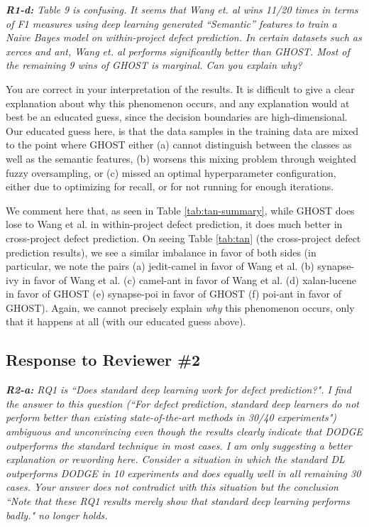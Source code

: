 \documentclass[10pt,compsoc,twocolumn]{IEEEtran}
\newcommand{\respto}[1]{
\fcolorbox{black}{black!15}{%
\label{resp:#1}%
\bf\scriptsize R{#1}}}
\newcommand{\BLUE}{\color{blue}}
\newcommand{\BLACK}{\color{black}}
\begin{document}
{\em {\bf R1-d:} Table 9 is confusing. It seems that Wang et. al wins 11/20 times in terms of F1 measures using deep learning generated “Semantic” features to train a Naive Bayes model on within-project defect prediction. In certain datasets such as xerces and ant, Wang et. al performs significantly better than GHOST. Most of the remaining 9 wins of GHOST is marginal. Can you explain why?
}

\respto{1a4}
\BLUE
You are correct in your interpretation of the results. It is difficult to give a clear explanation about why this phenomenon occurs, and any explanation would at best be an educated guess, since the decision boundaries are high-dimensional. Our educated guess here, is that the data samples in the training data are mixed to the point where GHOST either (a) cannot distinguish between the classes as well as the semantic features, (b) worsens this mixing problem through weighted fuzzy oversampling, or (c) missed an optimal hyperparameter configuration, either due to optimizing for recall, or for not running for enough iterations.

We comment here that, as seen in Table \ref{tab:tan-summary}, while GHOST does lose to Wang et al. in within-project defect prediction, it does much better in cross-project defect prediction. On seeing Table \ref{tab:tan} (the cross-project defect prediction results), we see a similar imbalance in favor of both sides (in particular, we note the pairs (a) jedit-camel in favor of Wang et al. (b) synapse-ivy in favor of Wang et al. (c) camel-ant in favor of Wang et al. (d) xalan-lucene in favor of GHOST (e) synapse-poi in favor of GHOST (f) poi-ant in favor of GHOST). Again, we cannot precisely explain \textit{why} this phenomenon occurs, only that it happens at all (with our educated guess above).
\BLACK

\subsection*{Response to Reviewer \#2}

{\em {\bf R2-a:} RQ1 is ``Does standard deep learning work for defect prediction?". I find the answer to this question (``For defect prediction, standard deep learners do not perform better than existing state-of-the-art methods in 30/40 experiments") ambiguous and unconvincing even though the results clearly indicate that DODGE outperforms the standard technique in most cases. I am only suggesting a better explanation or rewording here. Consider a situation in which the standard DL outperforms DODGE in 10 experiments and does equally well in all remaining 30 cases. Your answer does not contradict with this situation but the conclusion ``Note that these RQ1 results merely show that standard deep learning performs badly." no longer holds.}
\end{document}
